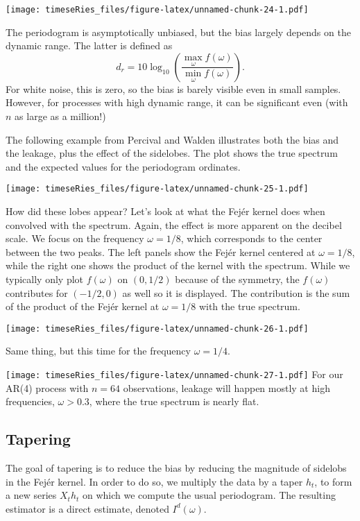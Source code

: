 \documentclass[]{book}
\begin{document}
\texttt{[image: timeseRies\_files/figure-latex/unnamed-chunk-24-1.pdf]}

The periodogram is asymptotically unbiased, but the bias largely depends
on the dynamic range. The latter is defined as
\[d_r = 10 \log_{10} \left( \frac{\max_{\omega}f(\omega)}{\min_{\omega}f(\omega)}\right).\]
For white noise, this is zero, so the bias is barely visible even in
small samples. However, for processes with high dynamic range, it can be
significant even (with \(n\) as large as a million!)

The following example from Percival and Walden illustrates both the bias
and the leakage, plus the effect of the sidelobes. The plot shows the
true spectrum and the expected values for the periodogram ordinates.

\texttt{[image: timeseRies\_files/figure-latex/unnamed-chunk-25-1.pdf]}

How did these lobes appear? Let's look at what the Fejér kernel does
when convolved with the spectrum. Again, the effect is more apparent on
the decibel scale. We focus on the frequency \(\omega=1/8\), which
corresponds to the center between the two peaks. The left panels show
the Fejér kernel centered at \(\omega=1/8\), while the right one shows
the product of the kernel with the spectrum. While we typically only
plot \(f(\omega)\) on \((0,1/2)\) because of the symmetry, the
\(f(\omega)\) contributes for \((-1/2,0)\) as well so it is displayed.
The contribution is the sum of the product of the Fejér kernel at
\(\omega=1/8\) with the true spectrum.

\texttt{[image: timeseRies\_files/figure-latex/unnamed-chunk-26-1.pdf]}

Same thing, but this time for the frequency \(\omega = 1/4\).

\texttt{[image: timeseRies\_files/figure-latex/unnamed-chunk-27-1.pdf]}
For our AR(4) process with \(n=64\) observations, leakage will happen
mostly at high frequencies, \(\omega > 0.3\), where the true spectrum is
nearly flat.

\subsection{Tapering}\label{tapering}

The goal of tapering is to reduce the bias by reducing the magnitude of
sidelobs in the Fejér kernel. In order to do so, we multiply the data by
a taper \(h_t\), to form a new series \(X_th_t\) on which we compute the
usual periodogram. The resulting estimator is a direct estimate, denoted
\(I^d(\omega)\).
\end{document}
